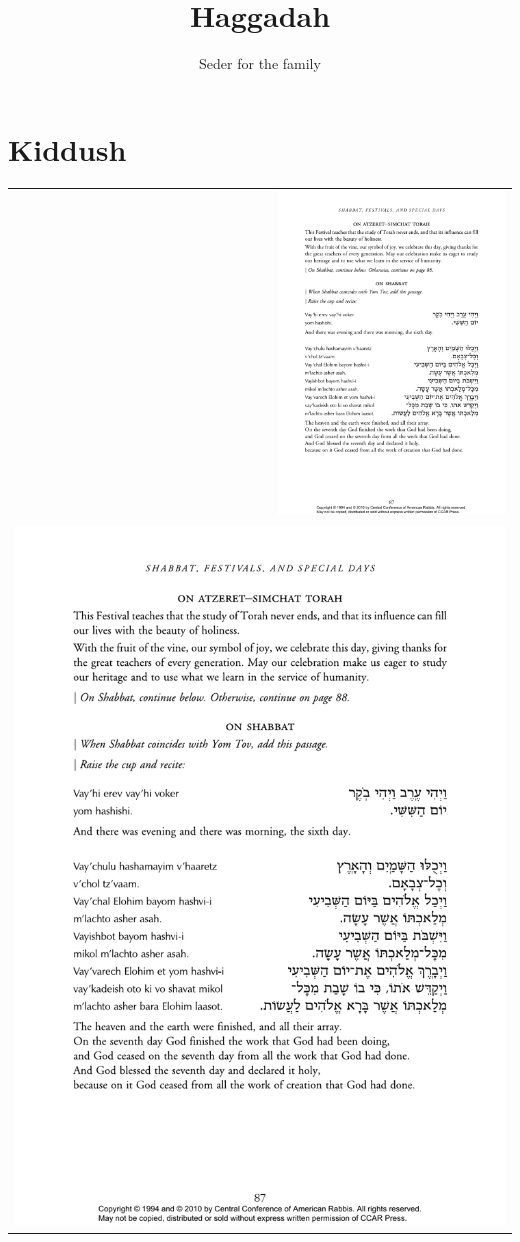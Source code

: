 \documentclass[12pt]{report}
\title{Haggadah}
\author{Seder for the family}
\begin{document}
\maketitle

\section*{Kiddush}

\begin{tabular}{r}
\includegraphics[width=6cm]{figs/0A010-vayehi}\\
\includegraphics[scale=1.5,trim=0mm 0mm 2mm 0mm,clip]{figs/0A014-vayechulu}\\
\end{tabular}
\end{document}
